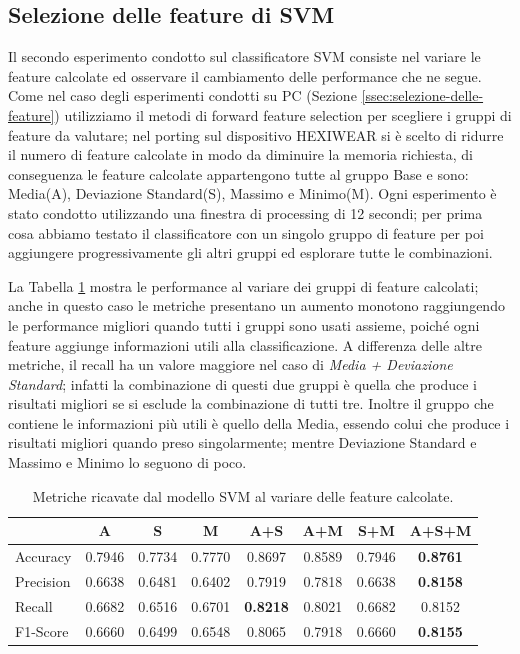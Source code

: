 \subsection{Selezione delle feature di SVM}
\label{ssec:selezione-delle-feature-di-svm-hexi}

Il secondo esperimento condotto sul classificatore SVM consiste nel variare le feature calcolate ed osservare il cambiamento delle performance che ne segue. 
Come nel caso degli esperimenti condotti su PC (Sezione \ref{ssec:selezione-delle-feature}) utilizziamo il metodi di forward feature selection per scegliere i gruppi di feature da valutare; nel porting sul dispositivo HEXIWEAR si è scelto di ridurre il numero di feature calcolate in modo da diminuire la memoria richiesta, di conseguenza le feature calcolate appartengono tutte al gruppo Base e sono: Media(A), Deviazione Standard(S), Massimo e Minimo(M).
Ogni esperimento è stato condotto utilizzando una finestra di processing di 12 secondi; per prima cosa abbiamo testato il classificatore con un singolo gruppo di feature per poi aggiungere progressivamente gli altri gruppi ed esplorare tutte le combinazioni.

La Tabella \ref{tab:metrics-svm-feat-hexi} mostra le performance al variare dei gruppi di feature calcolati; anche in questo caso le metriche presentano un aumento monotono raggiungendo le performance migliori quando tutti i gruppi sono usati assieme, poiché ogni feature aggiunge informazioni utili alla classificazione. A differenza delle altre metriche, il recall ha un valore maggiore nel caso di \textit{Media + Deviazione Standard}; infatti la combinazione di questi due gruppi è quella che produce i risultati migliori se si esclude la combinazione di tutti tre. Inoltre il gruppo che contiene le informazioni più utili è quello della Media, essendo colui che produce i risultati migliori quando preso singolarmente; mentre Deviazione Standard e Massimo e Minimo lo seguono di poco.

\begin{table}
    \centering
    \begin{tabular}{l c c c c c c c}
        \hline
        & A & S & M & A+S & A+M & S+M & A+S+M \\
        \hline
        Accuracy & 0.7946 & 0.7734 & 0.7770 & 0.8697 & 0.8589 & 0.7946 & \textbf{0.8761} \\
        Precision & 0.6638 & 0.6481 & 0.6402 & 0.7919 & 0.7818 & 0.6638 & \textbf{0.8158} \\
        Recall & 0.6682 & 0.6516 & 0.6701 & \textbf{0.8218} & 0.8021 & 0.6682 & 0.8152 \\
        F1-Score & 0.6660 & 0.6499 & 0.6548 & 0.8065 & 0.7918 & 0.6660 & \textbf{0.8155} \\
        \hline
    \end{tabular}
    \caption{Metriche ricavate dal modello SVM al variare delle feature calcolate.}
    \label{tab:metrics-svm-feat-hexi}
\end{table}

